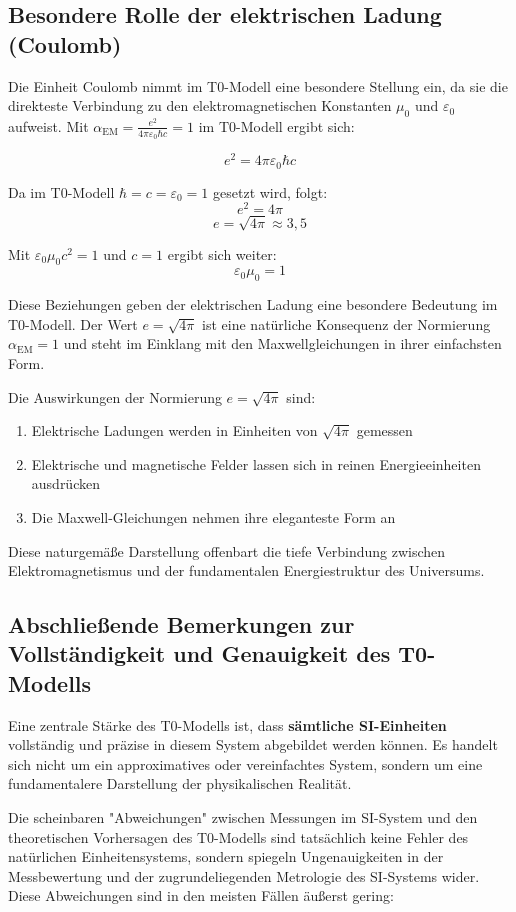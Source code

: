 \documentclass[12pt,a4paper]{article}
\newcommand{\alphaEM}{\alpha_{\text{EM}}}
\begin{document}
\subsection*{Besondere Rolle der elektrischen Ladung (Coulomb)}

Die Einheit Coulomb nimmt im T0-Modell eine besondere Stellung ein, da sie die direkteste Verbindung zu den elektromagnetischen Konstanten $\mu_0$ und $\varepsilon_0$ aufweist. Mit $\alphaEM = \frac{e^2}{4\pi\varepsilon_0\hbar c} = 1$ im T0-Modell ergibt sich:

\[
e^2 = 4\pi\varepsilon_0\hbar c
\]

Da im T0-Modell $\hbar = c = \varepsilon_0 = 1$ gesetzt wird, folgt:
\[
e^2 = 4\pi
\]
\[
e = \sqrt{4\pi} \approx 3,5
\]

Mit $\varepsilon_0\mu_0c^2 = 1$ und $c = 1$ ergibt sich weiter:
\[
\varepsilon_0\mu_0 = 1
\]

Diese Beziehungen geben der elektrischen Ladung eine besondere Bedeutung im T0-Modell. Der Wert $e = \sqrt{4\pi}$ ist eine natürliche Konsequenz der Normierung $\alphaEM = 1$ und steht im Einklang mit den Maxwellgleichungen in ihrer einfachsten Form.

Die Auswirkungen der Normierung $e = \sqrt{4\pi}$ sind:
\begin{enumerate}
	\item Elektrische Ladungen werden in Einheiten von $\sqrt{4\pi}$ gemessen
	\item Elektrische und magnetische Felder lassen sich in reinen Energieeinheiten ausdrücken
	\item Die Maxwell-Gleichungen nehmen ihre eleganteste Form an
\end{enumerate}

Diese naturgemäße Darstellung offenbart die tiefe Verbindung zwischen Elektromagnetismus und der fundamentalen Energiestruktur des Universums.

\subsection*{Abschließende Bemerkungen zur Vollständigkeit und Genauigkeit des T0-Modells}

Eine zentrale Stärke des T0-Modells ist, dass \textbf{sämtliche SI-Einheiten} vollständig und präzise in diesem System abgebildet werden können. Es handelt sich nicht um ein approximatives oder vereinfachtes System, sondern um eine fundamentalere Darstellung der physikalischen Realität.

Die scheinbaren "Abweichungen" zwischen Messungen im SI-System und den theoretischen Vorhersagen des T0-Modells sind tatsächlich keine Fehler des natürlichen Einheitensystems, sondern spiegeln Ungenauigkeiten in der Messbewertung und der zugrundeliegenden Metrologie des SI-Systems wider. Diese Abweichungen sind in den meisten Fällen äußerst gering:
\end{document}
